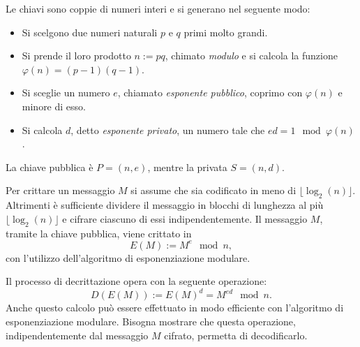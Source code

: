 Le chiavi sono coppie di numeri interi e si generano nel seguente modo:
\begin{itemize}
 \item Si scelgono due numeri naturali $p$ e $q$ primi molto grandi. 
 \item Si prende il loro prodotto $n := pq$, chimato \textit{modulo} e si calcola la funzione $\varphi(n) = (p-1)(q-1)$. 
 \item Si sceglie un numero $e$, chiamato \textit{esponente pubblico}, coprimo con $\varphi(n)$ e minore di esso. 
 \item Si calcola $d$, detto \textit{esponente privato}, un numero tale che $ed = 1 \mod \varphi(n)$. 
\end{itemize}
La chiave pubblica è $P = (n,e)$, mentre la privata $S = (n,d)$.

Per crittare un messaggio $M$ si assume che sia codificato in meno di $\lfloor \log_2(n) \rfloor$. 
Altrimenti è sufficiente dividere il messaggio in blocchi di lunghezza al più  $\lfloor \log_2(n) \rfloor$ e cifrare ciascuno di essi indipendentemente.
Il messaggio $M$, tramite la chiave pubblica, viene crittato in
\begin{equation}
 E(M) := M^e \mod n,
\end{equation}
con l'utilizzo dell'algoritmo di esponenziazione modulare.

Il processo di decrittazione opera con la seguente operazione:
\begin{equation}
 D(E(M)) := E(M)^d = M^{ed} \mod n.
\end{equation}
Anche questo calcolo può essere effettuato in modo efficiente con l'algoritmo di esponenziazione modulare.
Bisogna mostrare che questa operazione, indipendentemente dal messaggio $M$ cifrato, permetta di decodificarlo.

